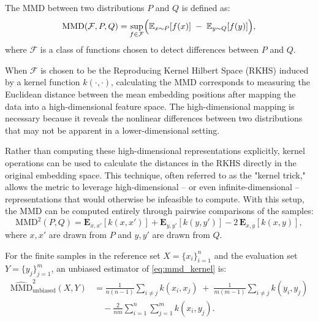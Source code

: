 The MMD between two distributions $P$ and $Q$ is defined as: 
\begin{equation}
    \text{MMD}(\mathcal{F},P,Q) = \sup_{f \in \mathcal{F}} 
    \Bigl( \mathbb{E}_{x \sim P}[f(x)] \;-\; \mathbb{E}_{y \sim Q}[f(y)] \Bigr),
    \label{eq:mmd_def}
\end{equation}
where $\mathcal{F}$ is a class of functions chosen to detect differences between $P$ and $Q$. 

When $\mathcal{F}$ is chosen to be the Reproducing Kernel Hilbert Space (RKHS) induced by a kernel function $k(\cdot,\cdot)$, calculating the MMD corresponds to measuring the Euclidean distance between the mean embedding positions after mapping the data into a high-dimensional feature space. The high-dimensional mapping is necessary because it reveals the nonlinear differences between two distributions that may not be apparent in a lower-dimensional setting. 

Rather than computing these high-dimensional representations explicitly, kernel operations can be used to calculate the distances in the RKHS directly in the original embedding space. This technique, often referred to as the "kernel trick," allows the metric to leverage high-dimensional -- or even infinite-dimensional -- representations that would otherwise be infeasible to compute. With this setup, the MMD can be computed entirely through pairwise comparisons of the samples: 
\begin{equation}
    \text{MMD}^2(P, Q) = \mathbf{E}_{x,x'}[k(x,x')] + \mathbf{E}_{y,y'}[k(y,y')] - 2\,\mathbf{E}_{x,y}[k(x,y)],
    \label{eq:mmd_kernel}
\end{equation}
where $x, x'$ are drawn from $P$ and $y, y'$ are drawn from $Q$. 

For the finite samples in the reference set $X = \{x_i\}_{i=1}^n$ and the evaluation set $Y = \{y_j\}_{j=1}^m$, an unbiased estimator of \ref{eq:mmd_kernel} is: 
\begin{align}
\label{eq:MMD_unbiased}
    \widehat{\text{MMD}}^2_{\text{unbiased}}(X,Y) &= \frac{1}{n(n-1)}\sum_{i\neq j}k(x_i,x_j) \;+\; \frac{1}{m(m-1)}\sum_{i\neq j}k(y_i,y_j) \nonumber\\
    &\quad - \frac{2}{nm}\sum_{i=1}^n\sum_{j=1}^m k(x_i,y_j).
\end{align}

